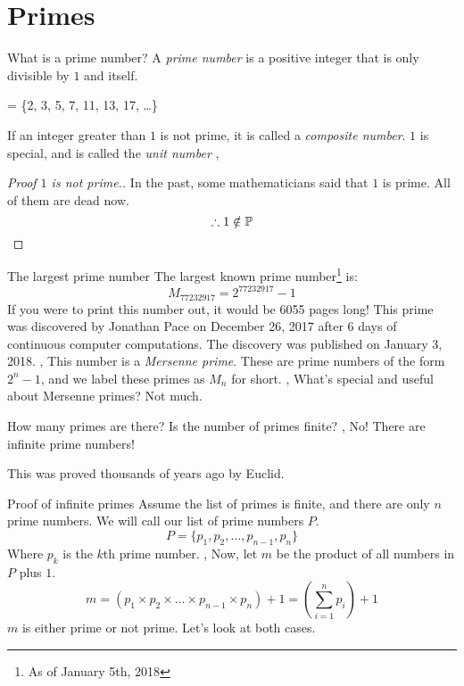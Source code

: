\section{Primes}
\begin{namedframe}{What is a prime number?}
	A \emph{prime number} is a positive integer that is only divisible by $1$ and itself.
	\begin{examples}
		\begin{compactmath}
			 = \{2, 3, 5, 7, 11, 13, 17, \dots\}
		\end{compactmath}
	\end{examples}
	If an integer greater than $1$ is not prime, it is called a \emph{composite number}.
	\vertspace
	$1$ is special, and is called the \emph{unit number}
	\sep
	\begin{proof}[Proof $1$ is not prime.]
		In the past, some mathematicians said that $1$ is prime.
		All of them are dead now.
		\[\therefore 1 \notin \mathbb{P} \qedhere\]
	\end{proof}
\end{namedframe}
\begin{namedframe}{The largest prime number}
	The largest known prime number\footnote{As of January 5th, 2018} is:
	\[M_{\num{77232917}} = 2^{\num{77232917}} - 1\]
	If you were to print this number out, it would be 6055 pages long!
	\vertspace
	This prime was discovered by Jonathan Pace on December 26, 2017 after 6 days of continuous computer computations.
	The discovery was published on January 3, 2018.
	\sep
	This number is a \emph{Mersenne prime}.
	These are prime numbers of the form $2^n - 1$, and we label these primes as $M_n$ for short.
	\sep
	What's special and useful about Mersenne primes?
	\pause
	Not much.
\end{namedframe}
\begin{namedframe}{How many primes are there?}
	Is the number of primes finite?
	\sep
	No! There are infinite prime numbers!

	This was proved thousands of years ago by Euclid.
\end{namedframe}
\begin{namedframe}{Proof of infinite primes}
	Assume the list of primes is finite, and there are only $n$ prime numbers. We will call our list of prime numbers $P$.
	\[P = \{p_1, p_2, \dots , p_{n-1}, p_n\}\]
	Where $p_k$ is the $k$th prime number.
	\sep
	Now, let $m$ be the product of all numbers in $P$ plus $1$.
	\[m = (p_1 \times p_2 \times \dots \times p_{n-1} \times p_n) + 1 = \left(\sum_{i=1}^n p_i\right) + 1\]
	$m$ is either prime or not prime.
	Let's look at both cases.
\end{namedframe}
